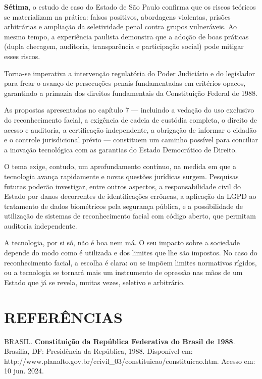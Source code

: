 \documentclass[12pt,a4paper]{article}
\begin{document}
\textbf{Sétima}, o estudo de caso do Estado de São Paulo confirma que os riscos teóricos se materializam na prática: falsos positivos, abordagens violentas, prisões arbitrárias e ampliação da seletividade penal contra grupos vulneráveis. Ao mesmo tempo, a experiência paulista demonstra que a adoção de boas práticas (dupla checagem, auditoria, transparência e participação social) pode mitigar esses riscos.

Torna-se imperativa a intervenção regulatória do Poder Judiciário e do legislador para frear o avanço de persecuções penais fundamentadas em critérios opacos, garantindo a primazia dos direitos fundamentais da Constituição Federal de 1988.

As propostas apresentadas no capítulo 7 --- incluindo a vedação do uso exclusivo do reconhecimento facial, a exigência de cadeia de custódia completa, o direito de acesso e auditoria, a certificação independente, a obrigação de informar o cidadão e o controle jurisdicional prévio --- constituem um caminho possível para conciliar a inovação tecnológica com as garantias do Estado Democrático de Direito.

O tema exige, contudo, um aprofundamento contínuo, na medida em que a tecnologia avança rapidamente e novas questões jurídicas surgem. Pesquisas futuras poderão investigar, entre outros aspectos, a responsabilidade civil do Estado por danos decorrentes de identificações errôneas, a aplicação da LGPD ao tratamento de dados biométricos pela segurança pública, e a possibilidade de utilização de sistemas de reconhecimento facial com código aberto, que permitam auditoria independente.

A tecnologia, por si só, não é boa nem má. O seu impacto sobre a sociedade depende do modo como é utilizada e dos limites que lhe são impostos. No caso do reconhecimento facial, a escolha é clara: ou se impõem limites normativos rígidos, ou a tecnologia se tornará mais um instrumento de opressão nas mãos de um Estado que já se revela, muitas vezes, seletivo e arbitrário.

\section*{REFERÊNCIAS}

BRASIL. \textbf{Constituição da República Federativa do Brasil de 1988}. Brasília, DF: Presidência da República, 1988. Disponível em: http://www.planalto.gov.br/ccivil\_03/constituicao/constituicao.htm. Acesso em: 10 jun. 2024.
\end{document}
